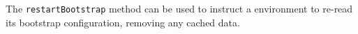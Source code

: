 The \verb+restartBootstrap+ method can be used to instruct a \Rapture environment to re-read its bootstrap
configuration, removing any cached data.
